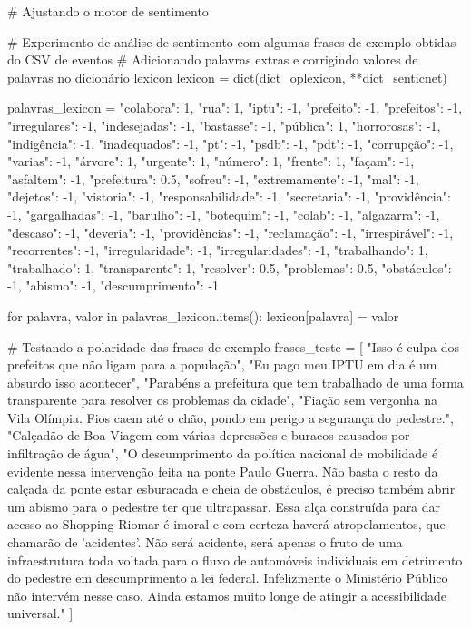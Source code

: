 \begin{codigo}[caption={Código de treinamento para análise de sentimento}, label={codigo:lex_train}, language=Python, breaklines=true]
# Ajustando o motor de sentimento

# Experimento de análise de sentimento com algumas frases de exemplo obtidas do CSV de eventos
# Adicionando palavras extras e corrigindo valores de palavras no dicionário lexicon
lexicon = dict(dict_oplexicon, **dict_senticnet)

palavras_lexicon = {
    "colabora": 1,
    "rua": 1,
    "iptu": -1,
    "prefeito": -1,
    "prefeitos": -1,
    "irregulares": -1,
    "indesejadas": -1,
    "bastasse": -1,
    "pública": 1,
    "horrorosas": -1,
    "indigência": -1,
    "inadequados": -1,
    "pt": -1,
    "psdb": -1,
    "pdt": -1,
    "corrupção": -1,
    "varias": -1,
    "árvore": 1,
    "urgente": 1,
    "número": 1,
    "frente": 1,
    "façam": -1,
    "asfaltem": -1,
    "prefeitura": 0.5,
    "sofreu": -1,
    "extremamente": -1,
    "mal": -1,
    "dejetos": -1,
    "vistoria": -1,
    "responsabilidade": -1,
    "secretaria": -1,
    "providência": -1,
    "gargalhadas": -1,
    "barulho": -1,
    "botequim": -1,
    "colab": -1,
    "algazarra": -1,
    "descaso": -1,
    "deveria": -1,
    "providências": -1,
    "reclamação": -1,
    "irrespirável": -1,
    "recorrentes": -1,
    "irregularidade": -1,
    "irregularidades": -1,
    "trabalhando": 1,
    "trabalhado": 1,
    "transparente": 1,
    "resolver": 0.5,
    "problemas": 0.5,
    "obstáculos": -1,
    "abismo": -1,
    "descumprimento": -1
}

for palavra, valor in palavras_lexicon.items():
  lexicon[palavra] = valor

# Testando a polaridade das frases de exemplo
frases_teste = [
    "Isso é culpa dos prefeitos que não ligam para a população",
    "Eu pago meu IPTU em dia é um absurdo isso acontecer",
    "Parabéns a prefeitura que tem trabalhado de uma forma transparente para resolver os problemas da cidade",
    "Fiação sem vergonha na Vila Olímpia. Fios caem até o chão, pondo em perigo a segurança do pedestre.",
    "Calçadão de Boa Viagem com várias depressões e buracos causados por infiltração de água",
    "O descumprimento da política nacional de mobilidade é evidente nessa intervenção feita na ponte Paulo Guerra. Não basta o resto da calçada da ponte estar esburacada e cheia de obstáculos, é preciso também abrir um abismo para o pedestre ter que ultrapassar. Essa alça construída para dar acesso ao Shopping Riomar é imoral e com certeza haverá atropelamentos, que chamarão de 'acidentes'. Não será acidente, será apenas o fruto de uma infraestrutura toda voltada para o fluxo de automóveis individuais em detrimento do pedestre em descumprimento a lei federal. Infelizmente o Ministério Público não intervém nesse caso. Ainda estamos muito longe de atingir a acessibilidade universal."
]


\end{codigo}
